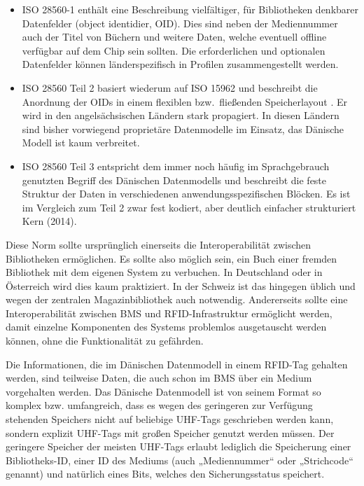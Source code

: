 \documentclass[
  11pt,
  letterpaper,
  DIV=11,
  twoside]{scrreprt}
\begin{document}
\begin{itemize}
\item
  ISO 28560-1 enthält eine Beschreibung vielfältiger, für Bibliotheken
  denkbarer Datenfelder (object identidier, OID). Dies sind neben der
  Mediennummer auch der Titel von Büchern und weitere Daten, welche
  eventuell offline verfügbar auf dem Chip sein sollten. Die
  erforderlichen und optionalen Datenfelder können länderspezifisch in
  Profilen zusammengestellt werden.
\item
  ISO 28560 Teil 2 basiert wiederum auf ISO 15962 und beschreibt die
  Anordnung der OIDs in einem flexiblen bzw.~fließenden Speicherlayout .
  Er wird in den angelsächsischen Ländern stark propagiert. In diesen
  Ländern sind bisher vorwiegend proprietäre Datenmodelle im Einsatz,
  das Dänische Modell ist kaum verbreitet.
\item
  ISO 28560 Teil 3 entspricht dem immer noch häufig im Sprachgebrauch
  genutzten Begriff des Dänischen Datenmodells und beschreibt die feste
  Struktur der Daten in verschiedenen anwendungsspezifischen Blöcken. Es
  ist im Vergleich zum Teil 2 zwar fest kodiert, aber deutlich einfacher
  strukturiert Kern (2014).
\end{itemize}

Diese Norm sollte ursprünglich einerseits die Interoperabilität zwischen
Bibliotheken ermöglichen. Es sollte also möglich sein, ein Buch einer
fremden Bibliothek mit dem eigenen System zu verbuchen. In Deutschland
oder in Österreich wird dies kaum praktiziert. In der Schweiz ist das
hingegen üblich und wegen der zentralen Magazinbibliothek auch
notwendig. Andererseits sollte eine Interoperabilität zwischen BMS und
RFID-Infrastruktur ermöglicht werden, damit einzelne Komponenten des
Systems problemlos ausgetauscht werden können, ohne die Funktionalität
zu gefährden.

Die Informationen, die im Dänischen Datenmodell in einem RFID-Tag
gehalten werden, sind teilweise Daten, die auch schon im BMS über ein
Medium vorgehalten werden. Das Dänische Datenmodell ist von seinem
Format so komplex bzw. umfangreich, dass es wegen des geringeren zur
Verfügung stehenden Speichers nicht auf beliebige UHF-Tags geschrieben
werden kann, sondern explizit UHF-Tags mit großen Speicher genutzt
werden müssen. Der geringere Speicher der meisten UHF-Tags erlaubt
lediglich die Speicherung einer Bibliotheks-ID, einer ID des Mediums
(auch „Mediennummer`` oder „Strichcode`` genannt) und natürlich eines
Bits, welches den Sicherungsstatus speichert.
\end{document}
